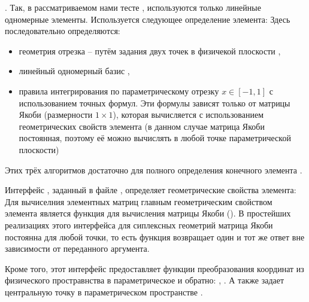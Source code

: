 \label{sec:linear_segment_assembly}.
Так, в рассматриваемом нами тесте , используются только линейные одномерные элементы.
Используется следующее определение элемента:
Здесь последовательно определяются:
\begin{itemize}
\item
геометрия отрезка  -- путём задания двух точек в физичекой плоскости ,
\item
линейный одномерный базис ,
\item
правила интегрирования  по параметрическому отрезку $x \in [-1, 1]$
с использованием точных формул. Эти формулы зависят только от матрицы Якоби  (размерности $1\times1$), которая
вычисляется с использованием геометрических свойств элемента
(в данном случае матрица Якоби постоянная, поэтому её можно вычислять в любой точке параметрической плоскости)
\end{itemize}
Этих трёх алгоритмов достаточно для полного определения конечного элемента .

Интерфейс , заданный в файле ,
определяет геометрические свойства элемента:
Для вычиселния элементных матриц главным геометрическим свойством
элемента является функция для вычисления матрицы Якоби ().
В простейших реализациях этого интерфейса для сиплексных геометрий
матрица Якоби постоянна для любой точки, то есть функция  возвращает
один и тот же ответ вне зависимости от переданного аргумента.

Кроме того, этот интерфейс предоставляет функции преобразования координат из физического простравнства
в параметрическое и обратно: , . А также задает центральную точку
в параметрическом пространстве .

